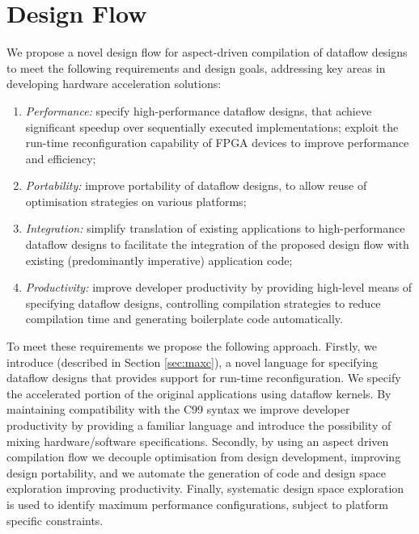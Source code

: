\section{Design Flow}
\label{sec:design-flow}

We propose a novel design flow for aspect-driven compilation of
dataflow designs to meet the following requirements and design goals,
addressing key areas in developing hardware acceleration solutions:
\begin{enumerate}
\item \emph{Performance:} specify high-performance dataflow designs,
  that achieve significant speedup over sequentially executed
  implementations; exploit the run-time reconfiguration capability of
  FPGA devices to improve performance and efficiency;
\item \emph{Portability:} improve portability of dataflow designs, to
  allow reuse of optimisation strategies on various platforms;
\item \emph{Integration:} simplify translation of existing
  applications to high-performance dataflow designs to facilitate the
  integration of the proposed design flow with existing (predominantly
  imperative) application code;
\item \emph{Productivity:} improve developer productivity by providing
  high-level means of specifying dataflow designs, controlling
  compilation strategies to reduce compilation time and generating
  boilerplate code automatically.
\end{enumerate}

To meet these requirements we propose the following approach. Firstly,
we introduce \MAXC{} (described in Section \ref{sec:maxc}), a novel
language for specifying dataflow designs that provides support for
run-time reconfiguration. We specify the accelerated portion of the
original applications using \MAXC{} dataflow kernels. By maintaining
compatibility with the C99 syntax we improve developer productivity
by providing a familiar language and introduce the possibility of
mixing hardware/software specifications. Secondly, by using an aspect
driven compilation flow we decouple optimisation from design
development, improving design portability, and we automate the
generation of code and design space exploration improving
productivity. Finally, systematic design space exploration is used to
identify maximum performance configurations, subject to platform
specific constraints.

